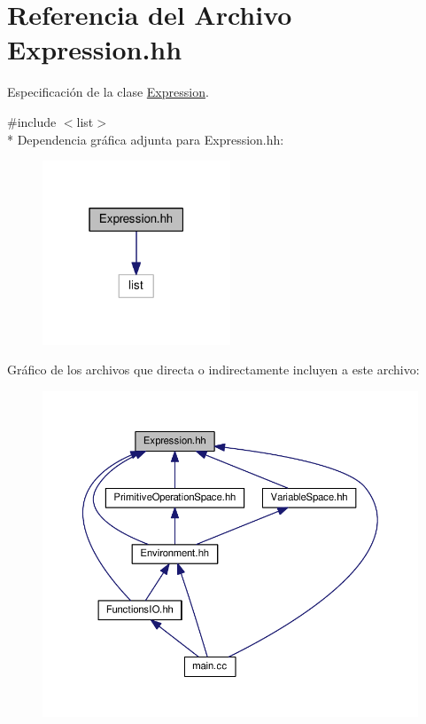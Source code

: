 \hypertarget{_expression_8hh}{}\section{Referencia del Archivo Expression.\+hh}
\label{_expression_8hh}


Especificación de la clase \hyperlink{class_expression}{Expression}.  


{\ttfamily \#include $<$list$>$}\\*
Dependencia gráfica adjunta para Expression.\+hh\+:
\nopagebreak
\begin{figure}[H]
\begin{center}
\leavevmode
\includegraphics[width=159pt]{_expression_8hh__incl}
\end{center}
\end{figure}
Gráfico de los archivos que directa o indirectamente incluyen a este archivo\+:
\nopagebreak
\begin{figure}[H]
\begin{center}
\leavevmode
\includegraphics[width=350pt]{_expression_8hh__dep__incl}
\end{center}
\end{figure}
